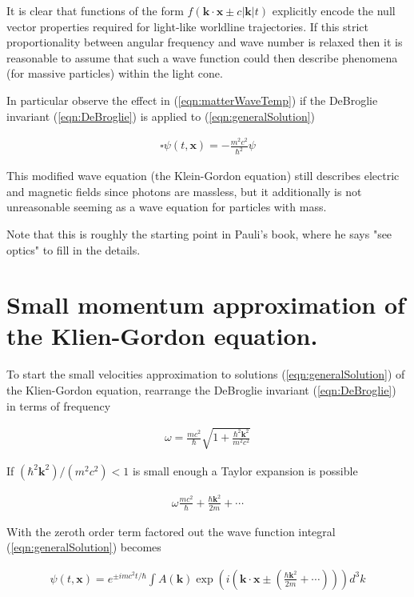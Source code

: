 \documentclass[]{eliblog}
\newcommand{\Abs}[1]{{\left\lvert{#1}\right\rvert}}
\newcommand{\Bk}[0]{\mathbf{k}}
\newcommand{\Bx}[0]{\mathbf{x}}
\newcommand{\delambertian}[0]{\square}
\begin{document}
It is clear that functions of the form $f(\Bk \cdot \Bx \pm c \Abs{\Bk} t)$ explicitly encode the null vector properties required for light-like worldline trajectories.  If this strict proportionality between angular frequency and wave number is relaxed then it is reasonable to assume that such a wave function could then describe phenomena (for massive particles) within the light cone.

In particular observe the effect in (\ref{eqn:matterWaveTemp}) if the DeBroglie invariant (\ref{eqn:DeBroglie}) is applied to (\ref{eqn:generalSolution})

\begin{align}
\delambertian {\psi}(t,\Bx) = -\frac{m^2 c^2}{\hbar^2} \psi
\end{align}

This modified wave equation (the Klein-Gordon equation) still describes electric and magnetic fields since photons are massless, but it additionally is not unreasonable seeming as a wave equation for particles with mass.

Note that this is roughly the starting point in Pauli's book, where he says "see optics" to fill in the details.

\section{Small momentum approximation of the Klien-Gordon equation.}

To start the small velocities approximation to solutions (\ref{eqn:generalSolution}) of the Klien-Gordon equation, rearrange the 
DeBroglie invariant (\ref{eqn:DeBroglie}) in terms of frequency

\begin{align}
\omega = \frac{m c^2}{\hbar} \sqrt{ 1 + \frac{\hbar^2 \Bk^2}{m^2 c^2}}
\end{align}

If $(\hbar^2 \Bk^2)/(m^2 c^2) < 1$ is small enough a Taylor expansion is possible

\begin{align}
\omega \frac{m c^2}{\hbar} + \frac{\hbar \Bk^2}{2 m} + \cdots
\end{align}

With the zeroth order term factored out the wave function integral (\ref{eqn:generalSolution}) becomes

\begin{align}
{\psi}(t,\Bx) = e^{\pm im c^2 t /\hbar} \int A(\Bk) \exp\left( i \left(\Bk \cdot \Bx \pm \left(\frac{\hbar \Bk^2}{2 m} + \cdots \right) \right) \right) d^3 k
\end{align}
\end{document}

